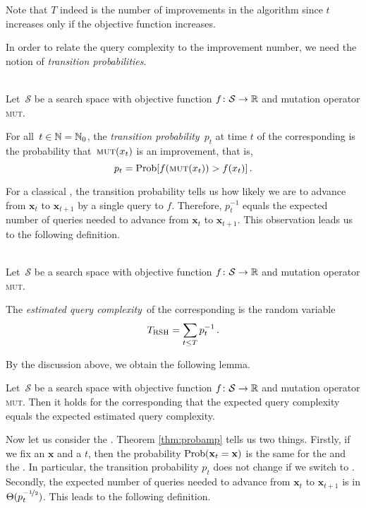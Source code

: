 Note that $T$ indeed is the number of improvements in the algorithm since $t$ increases only if the objective function increases.

In order to relate the query complexity to the improvement number, we need the notion of \emph{transition probabilities}.
\begin{definition}~\\
Let~$\mathcal{S}$ be a search space with objective function $f\colon \mathcal{S}\to\mathbb{R}$ and mutation operator \textsc{mut}.

For all~$t\in\mathbb{N} = \mathbb{N}_0$, the \emph{transition probability}~$p_t$ at time $t$ of the corresponding \rsh is the probability that~$\textsc{mut}(x_t)$ is an improvement, that is,
\[
p_t=\mathrm{Prob}[f(\textsc{mut}(x_t))>f(x_t)]\,.
\]
\end{definition}

For a classical \rsh, the transition probability tells us how likely we are to advance from $\mathbf{x}_t$ to $\mathbf{x}_{t+1}$ by a single query to $f$. Therefore, $p_t^{-1}$ equals the expected number of queries needed to advance from $\mathbf{x}_t$ to $\mathbf{x}_{t+1}$. This observation leads us to the following definition.
\begin{definition}[$\TRSH$]~\\
Let~$\mathcal{S}$ be a search space with objective function $f\colon \mathcal{S}\to\mathbb{R}$ and mutation operator \textsc{mut}.

The \emph{estimated query complexity}~\TRSH of the corresponding \rsh is the random variable
\[
T_{\mathrm{RSH}}=\sum_{t\le T}p_t^{-1}\,.
\]
\end{definition}

By the discussion above, we obtain the following lemma.

\begin{lemma}
\label{lem:tcl}
Let~$\mathcal{S}$ be a search space with objective function $f\colon \mathcal{S}\to\mathbb{R}$ and mutation operator \textsc{mut}. Then it holds for the corresponding \rsh that the expected query complexity equals the expected estimated query complexity.
\end{lemma}

Now let us consider the \qrsh. Theorem \ref{thm:probamp} tells us two things. Firstly, if we fix an $\mathbf{x}$ and a $t$, then the probability $\mathrm{Prob}(\mathbf{x}_t=\mathbf{x})$ is the same for the \rsh and the \qrsh. In particular, the transition probability $p_t$ does not change if we switch to \qrsh. Secondly, the expected number of queries needed to advance from $\mathbf{x}_t$ to $\mathbf{x}_{t+1}$ is in $\Theta(p_t^{-\nicefrac{1}{2}})$. This leads to the following definition.

